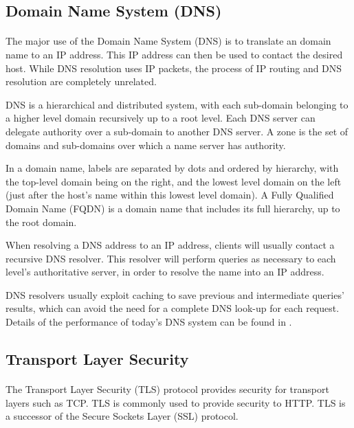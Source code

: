 \subsection{Domain Name System (DNS)}
\paragraph{}
The major use of the Domain Name System (DNS) is to translate an domain name to an IP address. This IP address can then be used to contact the desired host. While DNS resolution uses IP packets, the process of IP routing and DNS resolution are completely unrelated.

DNS is a hierarchical and distributed system, with each sub-domain belonging to a higher level domain recursively up to a root level. Each DNS server can delegate authority over a sub-domain to another DNS server. A zone is the set of domains and sub-domains over which a name server has authority.

In a domain name, labels are separated by dots and ordered by hierarchy, with the top-level domain being on the right, and the lowest level domain on the left (just after the host's name within this lowest level domain).
A Fully Qualified Domain Name (FQDN) is a domain name that includes its full hierarchy, up to the root domain.

When resolving a DNS address to an IP address, clients will usually contact a recursive DNS resolver. This resolver will perform queries as necessary to each level's authoritative server, in order to resolve the name into an IP address.

DNS resolvers usually exploit caching to save previous and intermediate queries' results, which can avoid the need for a complete DNS look-up for each request.  Details of the performance of today's DNS system can be found in \cite{bentahar_dns_2013}.



\subsection{Transport Layer Security}
\paragraph{}
The Transport Layer Security (TLS) protocol provides security for transport layers such as TCP. TLS is commonly used to provide security to HTTP\cite{rfc5246, rescorla_ssl_2000}. TLS is a successor of the Secure Sockets Layer (SSL) protocol.

